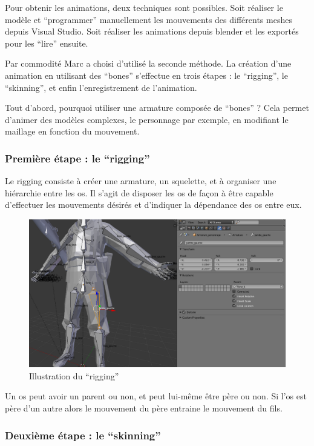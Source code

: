 \documentclass[11pt]{report}
\begin{document}
Pour obtenir les animations, deux techniques sont possibles. Soit réaliser le modèle et ``programmer'' manuellement les mouvements des différents meshes depuis Visual Studio. Soit réaliser les animations depuis blender et les exportés pour les ``lire'' ensuite.

Par commodité Marc a choisi d’utilisé la seconde méthode. La création d’une animation en utilisant des ``bones''  s’effectue en trois étapes : le ``rigging'', le ``skinning'', et enfin l’enregistrement de l’animation.

Tout d’abord, pourquoi utiliser une armature composée de ``bones'' ?  Cela permet d’animer des modèles complexes, le personnage par exemple, en modifiant le maillage en fonction du mouvement.

\subsubsection{Première étape : le ``rigging''}

Le rigging consiste à créer une armature, un squelette, et à organiser une hiérarchie entre les os.
Il s’agit de disposer les os de façon à être capable d’effectuer les mouvements désirés et d’indiquer la dépendance des os entre eux.

\begin{figure}[htbp]
\centering
\includegraphics[scale=0.30]{rigging.png}
\caption{Illustration du ``rigging''}
\end{figure}

Un os peut avoir un parent ou non, et peut lui-même être père ou non. Si l’os est père d’un autre alors le mouvement du père entraine le mouvement du fils.

\subsubsection{Deuxième étape : le ``skinning''}
\end{document}
